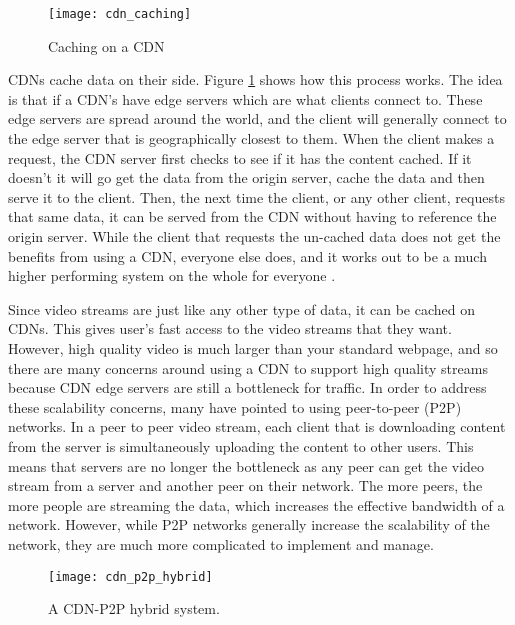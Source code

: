 \documentclass[12pt]{article}
\begin{document}
\begin{figure}[htp]
  \begin{center}
    \texttt{[image: cdn\_caching]}
    \caption{Caching on a CDN}
    \label{fig:cdn_caching}
  \end{center}
\end{figure}

CDNs cache data on their side.  Figure \ref{fig:cdn_caching} shows how this process works.  The idea is that if a CDN's have edge servers which are what clients connect to.  These edge servers are spread around the world, and the client will generally connect to the edge server that is geographically closest to them.  When the client makes a request, the CDN server first checks to see if it has the content cached.  If it doesn't it will go get the data from the origin server, cache the data and then serve it to the client.  Then, the next time the client, or any other client, requests that same data, it can be served from the CDN without having to reference the origin server.  While the client that requests the un-cached data does not get the benefits from using a CDN, everyone else does, and it works out to be a much higher performing system on the whole for everyone \cite{cdn_tutorial2}.

Since video streams are just like any other type of data, it can be cached on CDNs.  This gives user's fast access to the video streams that they want.  However, high quality video is much larger than your standard webpage, and so there are many concerns around using a CDN to support high quality streams \cite{6089062} because CDN edge servers are still a bottleneck for traffic.  In order to address these scalability concerns, many have pointed to using peer-to-peer (P2P) networks.  In a peer to peer video stream, each client that is downloading content from the server is simultaneously uploading the content to other users.  This means that servers are no longer the bottleneck as any peer can get the video stream from a server and another peer on their network.  The more peers, the more people are streaming the data, which increases the effective bandwidth of a network.  However, while P2P networks generally increase the scalability of the network, they are much more complicated to implement and manage.

\begin{figure}[htp]
  \begin{center}
    \texttt{[image: cdn\_p2p\_hybrid]}
    \caption{A CDN-P2P hybrid system.}
    \label{fig:cdn_p2p_hybrid}
  \end{center}
\end{figure}
\end{document}
